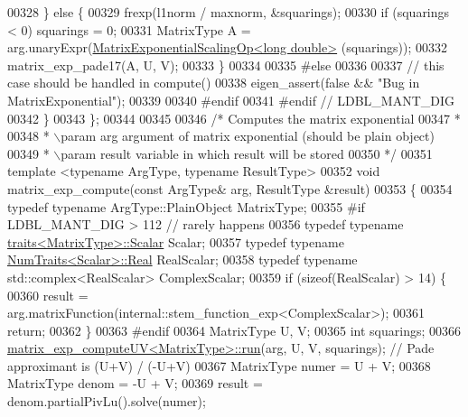 \begin{DoxyCode}
00328     \} \textcolor{keywordflow}{else} \{
00329       frexp(l1norm / maxnorm, &squarings);
00330       \textcolor{keywordflow}{if} (squarings < 0) squarings = 0;
00331       MatrixType A = arg.unaryExpr(\hyperlink{struct_eigen_1_1internal_1_1_matrix_exponential_scaling_op}{MatrixExponentialScalingOp<long double>}
      (squarings));
00332       matrix\_exp\_pade17(A, U, V);
00333     \}
00334   
00335 \textcolor{preprocessor}{#else}
00336   
00337     \textcolor{comment}{// this case should be handled in compute()}
00338     eigen\_assert(\textcolor{keyword}{false} && \textcolor{stringliteral}{"Bug in MatrixExponential"}); 
00339   
00340 \textcolor{preprocessor}{#endif}
00341 \textcolor{preprocessor}{#endif  // LDBL\_MANT\_DIG}
00342   \}
00343 \};
00344 
00345 
00346 \textcolor{comment}{/* Computes the matrix exponential}
00347 \textcolor{comment}{ *}
00348 \textcolor{comment}{ * \(\backslash\)param arg    argument of matrix exponential (should be plain object)}
00349 \textcolor{comment}{ * \(\backslash\)param result variable in which result will be stored}
00350 \textcolor{comment}{ */}
00351 \textcolor{keyword}{template} <\textcolor{keyword}{typename} ArgType, \textcolor{keyword}{typename} ResultType>
00352 \textcolor{keywordtype}{void} matrix\_exp\_compute(\textcolor{keyword}{const} ArgType& arg, ResultType &result)
00353 \{
00354   \textcolor{keyword}{typedef} \textcolor{keyword}{typename} ArgType::PlainObject MatrixType;
00355 \textcolor{preprocessor}{#if LDBL\_MANT\_DIG > 112 // rarely happens}
00356   \textcolor{keyword}{typedef} \textcolor{keyword}{typename} \hyperlink{struct_eigen_1_1internal_1_1traits}{traits<MatrixType>::Scalar} Scalar;
00357   \textcolor{keyword}{typedef} \textcolor{keyword}{typename} \hyperlink{group___core___module_struct_eigen_1_1_num_traits}{NumTraits<Scalar>::Real} RealScalar;
00358   \textcolor{keyword}{typedef} \textcolor{keyword}{typename} std::complex<RealScalar> ComplexScalar;
00359   \textcolor{keywordflow}{if} (\textcolor{keyword}{sizeof}(RealScalar) > 14) \{
00360     result = arg.matrixFunction(internal::stem\_function\_exp<ComplexScalar>);
00361     \textcolor{keywordflow}{return};
00362   \}
00363 \textcolor{preprocessor}{#endif}
00364   MatrixType U, V;
00365   \textcolor{keywordtype}{int} squarings; 
00366   \hyperlink{struct_eigen_1_1internal_1_1matrix__exp__compute_u_v_a7847531ae0fccc8ec7648f95846c8adb}{matrix\_exp\_computeUV<MatrixType>::run}(arg, U, V, squarings); \textcolor{comment}{// Pade
       approximant is (U+V) / (-U+V)}
00367   MatrixType numer = U + V;
00368   MatrixType denom = -U + V;
00369   result = denom.partialPivLu().solve(numer);

\end{DoxyCode}
